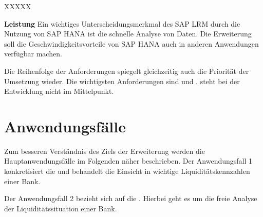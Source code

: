 \begin{onehalfspacing}
\begin{seToplist}{ XXXXX }
\item[\anfl{leistung}] \textbf{Leistung} \newline
Ein wichtiges Unterscheidungsmerkmal des SAP LRM durch die Nutzung von SAP HANA ist die schnelle Analyse von Daten. Die Erweiterung soll die Geschwindigkeitsvorteile von SAP HANA auch in anderen Anwendungen verfügbar machen.

\end{seToplist}

Die Reihenfolge der Anforderungen spiegelt gleichzeitig auch die Priorität der Umsetzung wieder. Die wichtigsten Anforderungen sind  und .  steht bei der Entwicklung nicht im Mittelpunkt.

\section{Anwendungsfälle}
Zum besseren Verständnis des Ziels der Erweiterung werden die Hauptanwendungsfälle im Folgenden näher beschrieben. Der Anwendungsfall 1 konkretisiert die  und behandelt die Einsicht in wichtige Liquiditätskennzahlen einer Bank.


Der Anwendungsfall 2 bezieht sich auf die . Hierbei geht es um die freie Analyse der Liquiditätssituation einer Bank.

\end{onehalfspacing}
